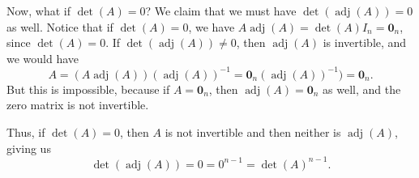\documentclass[letterpaper,12pt]{article}
\begin{document}
\begin{enumerate}
Now, what if $\det(A)=0$? We claim that we must have $\det(\operatorname{adj}(A))=0$ as well. Notice that if $\det(A)=0$, we have $A\operatorname{adj}(A)=\det(A)I_n = \boldsymbol{0}_n$, since $\det(A)=0$. If $\det(\operatorname{adj}(A))\neq 0$, then $\operatorname{adj}(A)$ is invertible, and we would have
\[
 A = (A\operatorname{adj}(A))(\operatorname{adj}(A))^{-1} = \boldsymbol{0}_n(\operatorname{adj}(A))^{-1})=\boldsymbol{0}_n.
\]
But this is impossible, because if $A=\boldsymbol{0}_n$, then $\operatorname{adj}(A)=\boldsymbol{0}_n$ as well, and the zero matrix is not invertible.

Thus, if $\det(A)=0$, then $A$ is not invertible and then neither is $\operatorname{adj}(A)$, giving us 
\[\det(\operatorname{adj}(A)) = 0 = 0^{n-1}=\det(A)^{n-1}.\]

\end{enumerate}
\end{document}
